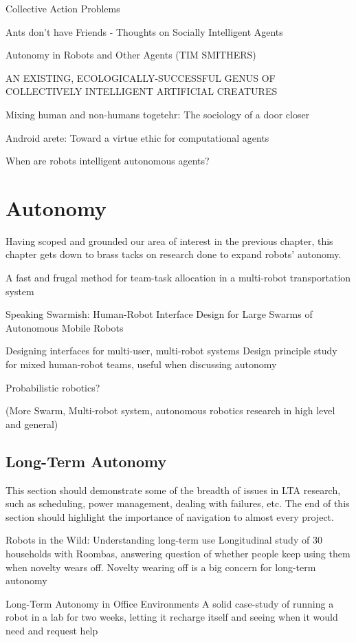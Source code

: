 \documentclass{sfuthesis}
\begin{document}
Collective Action Problems

Ants don't have Friends - Thoughts on Socially Intelligent Agents

Autonomy in Robots and Other Agents (TIM SMITHERS)

AN EXISTING, ECOLOGICALLY-SUCCESSFUL GENUS OF COLLECTIVELY INTELLIGENT ARTIFICIAL CREATURES

Mixing human and non-humans togetehr: The sociology of a door closer

Android arete: Toward a virtue ethic for computational agents

When are robots intelligent autonomous agents?

\chapter{Autonomy}

Having scoped and grounded our area of interest in the previous chapter, this chapter gets down to brass tacks on research done to expand robots' autonomy.

A fast and frugal method for team-task allocation in a multi-robot transportation system

Speaking Swarmish: Human-Robot Interface Design for Large Swarms of Autonomous Mobile Robots

Designing interfaces for multi-user, multi-robot systems	Design principle study for mixed human-robot teams, useful when discussing autonomy	

Probabilistic robotics?

(More Swarm, Multi-robot system, autonomous robotics research in high level and general)

\section{Long-Term Autonomy}

This section should demonstrate some of the breadth of issues in LTA research, such as scheduling, power management, dealing with failures, etc. The end of this section should highlight the importance of navigation to almost every project.

Robots in the Wild: Understanding long-term use	Longitudinal study of 30 households with Roombas, answering question of whether people keep using them when novelty wears off. Novelty wearing off is a big concern for long-term autonomy	

Long-Term Autonomy in Office Environments	A solid case-study of running a robot in a lab for two weeks, letting it recharge itself and seeing when it would need and request help
\end{document}
